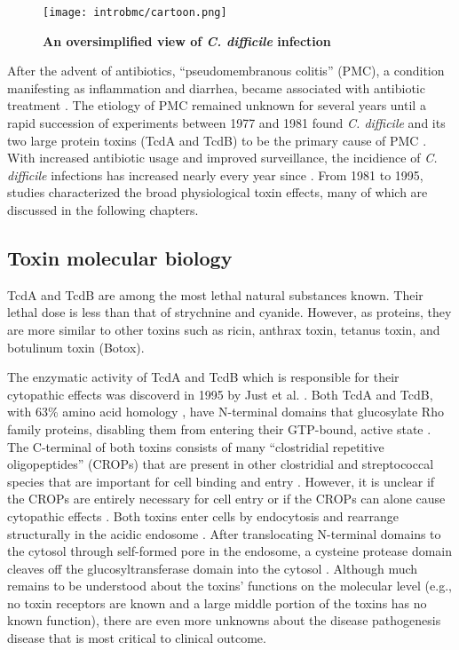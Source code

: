\begin{figure}[h!]
  \centering
  \texttt{[image: introbmc/cartoon.png]}
  \caption{\textbf{An oversimplified view of \textit{C. difficile} infection}}
  \label{introbmc:cartoon}
\end{figure}

After the advent of antibiotics, ``pseudomembranous colitis'' (PMC), a condition
manifesting as inflammation and diarrhea, became associated
with antibiotic treatment \cite{Tedesco:1974jo,Bartlett:2008jx}. 
The etiology of PMC remained unknown
for several years until a rapid succession of experiments between 1977 and 1981
found \textit{C. difficile} and its two large protein toxins (TcdA and TcdB)
 to be the primary cause of PMC 
\cite{Lusk:1978ub,Chang:1978um,Browne:1977ui,Fekety:1979ul,
Ebright:1981uj,Taylor:1981uda,Bartlett:1978tj,Bartlett:1977wra,
Lusk:1977wg,MRKeighley:1978ku}. 
With increased antibiotic usage and improved surveillance,
the incidience of \textit{C. difficile} infections has increased 
nearly every year since \cite{Lucado:2012wl}.
From 1981 to 1995, 
studies characterized the broad physiological toxin effects,
many of which are discussed in the following chapters.


\subsection{Toxin molecular biology}
TcdA and TcdB are among the most lethal natural substances known.
Their lethal dose is less than that of strychnine and cyanide.
However, as proteins, they are more similar to other toxins such as 
ricin, anthrax toxin,
tetanus toxin, and botulinum toxin (Botox).

The enzymatic activity of TcdA and TcdB which is responsible
for their cytopathic effects was discoverd 
in 1995 by Just et al. \cite{Just:1995ei,Just:1995kz}.
Both TcdA and TcdB, with 63\% amino acid
homology \cite{vonEichelStreiber:1992wu}, have N-terminal
domains that glucosylate Rho family proteins, disabling
them from entering their GTP-bound, active state \cite{Just:1995ei,Just:1995kz}.
The C-terminal of both toxins consists of many ``clostridial
repetitive oligopeptides'' (CROPs) that are present in 
other clostridial and streptococcal species 
\cite{vonEichelStreiber:1990ti,vonEichelStreiber:1992vb}
that are important for cell binding and 
entry \cite{Ho:2005vm,Greco:2006wf,Frisch:2003jo}.
However, it is unclear if the CROPs are entirely necessary
for cell entry or if the CROPs can alone cause
cytopathic effects \cite{Yeh:2008hda,Zemljic:2010ub}. Both toxins
enter cells by endocytosis and rearrange structurally
in the acidic endosome \cite{Papatheodorou:2010io,QaDan:2000fj}.
After translocating N-terminal domains to the cytosol through
self-formed pore in the endosome,
a cysteine protease domain cleaves off the glucosyltransferase
domain into the cytosol \cite{Egerer:2007fy,Genisyuerek:2011dr,Pfeifer:2003bx}.
Although much remains to be understood about the 
toxins' functions on the molecular level (e.g., no toxin receptors are known and
a large middle portion of the toxins has no known function), there
are even more unknowns about the disease pathogenesis disease that
is most critical to clinical outcome.

